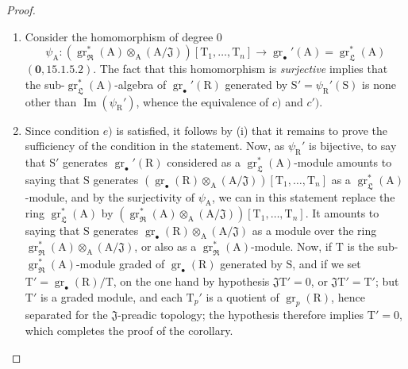 \begin{proof}
\begin{enumerate}
\item[\rm(i)] Consider the homomorphism of degree $0$
\[
  \psi_\mathrm{A}:(\operatorname{gr}_\mathfrak{R}^*(\mathrm{A})\otimes_\mathrm{A}(\mathrm{A}/\mathfrak{J}))[\mathrm{T}_1,\ldots,\mathrm{T}_n]\to\operatorname{gr}_\bullet'(\mathrm{A})=\operatorname{gr}_\mathfrak{L}^*(\mathrm{A})
\]
$(\mathbf{0},15.1.5.2)$. The fact that this homomorphism is \emph{surjective} implies that the sub-$\operatorname{gr}_\mathfrak{L}^*(\mathrm{A})$-algebra of $\operatorname{gr}_\bullet'(\mathrm{R})$ generated by $\mathrm{S}'=\psi_\mathrm{R}'(\mathrm{S})$ is none other than $\operatorname{Im}(\psi_\mathrm{R}')$, whence the equivalence of $c)$ and $c')$.

\item[\rm(ii)] Since condition $e)$ is satisfied, it follows by (i) that it remains to prove the sufficiency of the condition in the statement. Now, as $\psi_\mathrm{R}'$ is bijective, to say that $\mathrm{S}'$ generates $\operatorname{gr}_\bullet'(\mathrm{R})$ considered as a $\operatorname{gr}_\mathfrak{L}^*(\mathrm{A})$-module amounts to saying that $\mathrm{S}$ generates $(\operatorname{gr}_\bullet(\mathrm{R})\otimes_\mathrm{A}(\mathrm{A}/\mathfrak{J}))[\mathrm{T}_1,\ldots,\mathrm{T}_n]$ as a $\operatorname{gr}_\mathfrak{L}^*(\mathrm{A})$-module, and by the surjectivity of $\psi_\mathrm{A}$, we can in this statement replace the ring $\operatorname{gr}_\mathfrak{L}^*(\mathrm{A})$ by $(\operatorname{gr}_\mathfrak{R}^*(\mathrm{A})\otimes_\mathrm{A}(\mathrm{A}/\mathfrak{J}))[\mathrm{T}_1,\ldots,\mathrm{T}_n]$. It amounts to saying that $\mathrm{S}$ generates $\operatorname{gr}_\bullet(\mathrm{R})\otimes_\mathrm{A}(\mathrm{A}/\mathfrak{J})$ as a module over the ring $\operatorname{gr}_\mathfrak{R}^*(\mathrm{A})\otimes_\mathrm{A}(\mathrm{A}/\mathfrak{J})$, or also as a $\operatorname{gr}_\mathfrak{R}^*(\mathrm{A})$-module. Now, if $\mathrm{T}$ is the sub-$\operatorname{gr}_\mathfrak{R}^*(\mathrm{A})$-module graded of $\operatorname{gr}_\bullet(\mathrm{R})$ generated by $\mathrm{S}$, and if we set $\mathrm{T}'=\operatorname{gr}_\bullet(\mathrm{R})/\mathrm{T}$, on the one hand by hypothesis $\mathfrak{J}\mathrm{T}'=0$, or $\mathfrak{J}\mathrm{T}'=\mathrm{T}'$; but $\mathrm{T}'$ is a graded module, and each $\mathrm{T}_p'$ is a quotient of $\operatorname{gr}_p(\mathrm{R})$, hence separated for the $\mathfrak{J}$-preadic topology; the hypothesis therefore implies $\mathrm{T}'=0$, which completes the proof of the corollary.
\end{enumerate}
\end{proof}

